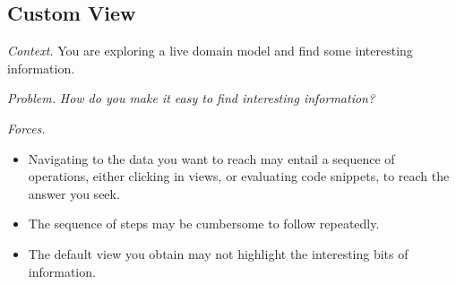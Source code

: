\documentclass[sigconf,screen]{acmart}
\newcommand\tg[1]{\nbc{TG}{#1}{blue}}
\newcommand\cp[1]{\nbe{Cesare}{#1}{olive}} %
\newcommand\ws[1]{\nbe{Workshop}{#1}{teal}} %
\newcommand{\pattern}[2]{\needlines{10}
\subsection*{#1}\label{pat:#2}}
\newcommand{\patsec}[1]{\noindent\textit{#1.}\xspace}
\begin{document}
\pattern{Custom View}{CustomView}



\patsec{Context}
You are exploring a live domain model and find some interesting information.

\patsec{Problem}
\emph{How do you make it easy to find interesting information?}

\patsec{Forces}
\begin{itemize}[---]
\item Navigating to the data you want to reach may entail a sequence of operations, either clicking in views, or evaluating code snippets, to reach the answer you seek.
\item The sequence of steps may be cumbersome to follow repeatedly.
\item The default view you obtain may not highlight the interesting bits of information.
\end{itemize}
\end{document}
